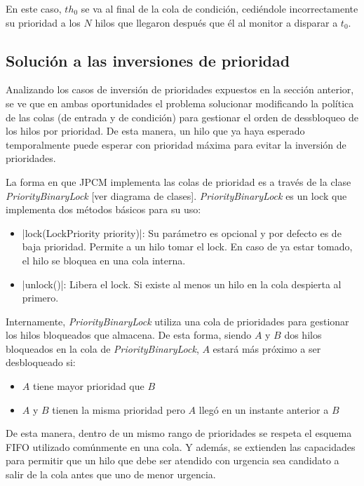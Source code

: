 En este caso, $th_{0}$ se va al final de la cola de condición, cediéndole
incorrectamente su prioridad a los $N$ hilos que llegaron después que él al
monitor a disparar a $t_{0}$.

\subsection{Solución a las inversiones de prioridad}

Analizando los casos de inversión de prioridades expuestos en la sección
anterior, se ve que en ambas oportunidades el problema solucionar modificando
la política de las colas (de entrada y de condición) para gestionar el orden de
dessbloqueo de los hilos por prioridad. De esta manera, un hilo que ya haya
esperado temporalmente puede esperar con prioridad máxima para evitar la
inversión de prioridades.

La forma en que JPCM implementa las colas de prioridad es a través de la clase
\textit{PriorityBinaryLock} {\color{red}[ver diagrama de clases]}.
\textit{PriorityBinaryLock} es un lock que implementa dos métodos básicos para
su uso:
\begin{itemize}
  \item {}|lock(LockPriority priority)|: Su parámetro es opcional y por
  defecto es de baja prioridad. Permite a un hilo tomar el lock. En caso de ya
  estar tomado, el hilo se bloquea en una cola interna.
  \item {}|unlock()|: Libera el lock. Si existe al menos un hilo en la
  cola despierta al primero.
\end{itemize}

Internamente, \textit{PriorityBinaryLock} utiliza una cola de prioridades para
gestionar los hilos bloqueados que almacena. De esta forma, siendo $A$ y $B$
dos hilos bloqueados en la cola de \textit{PriorityBinaryLock}, $A$ estará más
próximo a ser desbloqueado si:
\begin{itemize}
  \item $A$ tiene mayor prioridad que $B$
  \item $A$ y $B$ tienen la misma prioridad pero $A$ llegó en un instante
  anterior a $B$
\end{itemize}

De esta manera, dentro de un mismo rango de prioridades se respeta el esquema
FIFO utilizado comúnmente en una cola. Y además, se extienden las capacidades
para permitir que un hilo que debe ser atendido con urgencia sea candidato a
salir de la cola antes que uno de menor urgencia.

